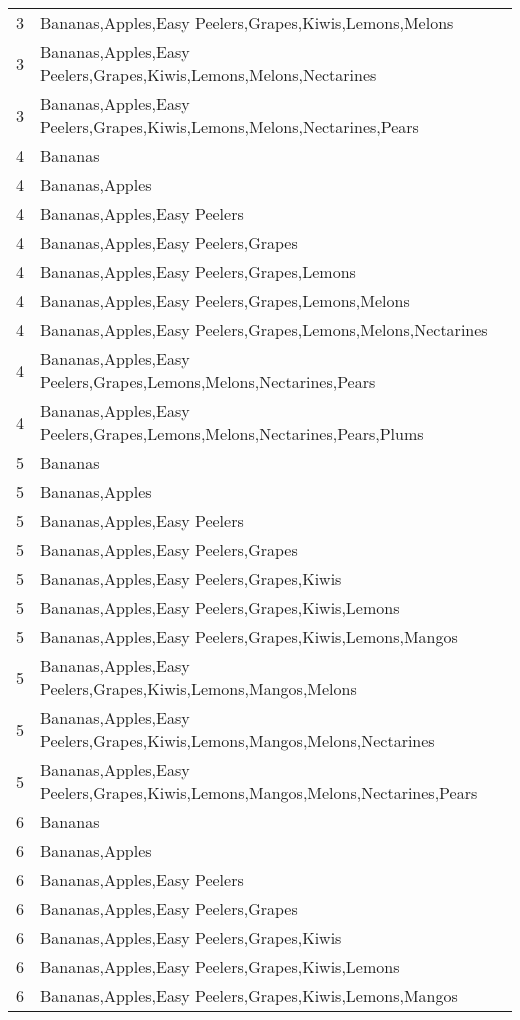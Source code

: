 \documentclass[11pt]{article}
\begin{document}
\begin{table}[h]
\begin{center}
\begin{tabular}{ll}
3 & Bananas,Apples,Easy Peelers,Grapes,Kiwis,Lemons,Melons \\
3 & Bananas,Apples,Easy Peelers,Grapes,Kiwis,Lemons,Melons,Nectarines \\
3 & Bananas,Apples,Easy Peelers,Grapes,Kiwis,Lemons,Melons,Nectarines,Pears \\
4 & Bananas \\
4 & Bananas,Apples \\
4 & Bananas,Apples,Easy Peelers \\
4 & Bananas,Apples,Easy Peelers,Grapes \\
4 & Bananas,Apples,Easy Peelers,Grapes,Lemons \\
4 & Bananas,Apples,Easy Peelers,Grapes,Lemons,Melons \\
4 & Bananas,Apples,Easy Peelers,Grapes,Lemons,Melons,Nectarines \\
4 & Bananas,Apples,Easy Peelers,Grapes,Lemons,Melons,Nectarines,Pears \\
4 & Bananas,Apples,Easy Peelers,Grapes,Lemons,Melons,Nectarines,Pears,Plums \\
5 & Bananas \\
5 & Bananas,Apples \\
5 & Bananas,Apples,Easy Peelers \\
5 & Bananas,Apples,Easy Peelers,Grapes \\
5 & Bananas,Apples,Easy Peelers,Grapes,Kiwis \\
5 & Bananas,Apples,Easy Peelers,Grapes,Kiwis,Lemons \\
5 & Bananas,Apples,Easy Peelers,Grapes,Kiwis,Lemons,Mangos \\
5 & Bananas,Apples,Easy Peelers,Grapes,Kiwis,Lemons,Mangos,Melons \\
5 & Bananas,Apples,Easy Peelers,Grapes,Kiwis,Lemons,Mangos,Melons,Nectarines \\
5 & Bananas,Apples,Easy Peelers,Grapes,Kiwis,Lemons,Mangos,Melons,Nectarines,Pears \\
6 & Bananas \\
6 & Bananas,Apples \\
6 & Bananas,Apples,Easy Peelers \\
6 & Bananas,Apples,Easy Peelers,Grapes \\
6 & Bananas,Apples,Easy Peelers,Grapes,Kiwis \\
6 & Bananas,Apples,Easy Peelers,Grapes,Kiwis,Lemons \\
6 & Bananas,Apples,Easy Peelers,Grapes,Kiwis,Lemons,Mangos \\

\end{tabular}
\end{center}
\end{table}
\end{document}
